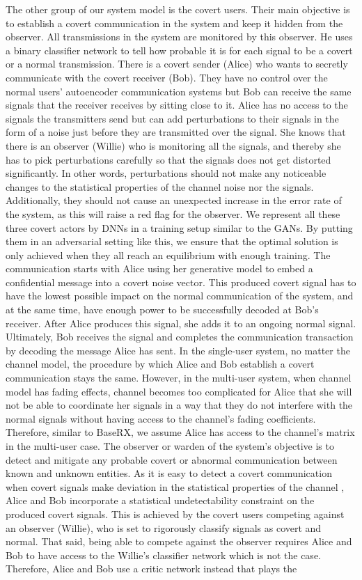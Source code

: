 The other group of our system model is the covert users. Their main objective is to establish a covert communication in the system and keep it hidden from the observer. All transmissions in the system are monitored by this observer. He uses a binary classifier network to tell how probable it is for each signal to be a covert or a normal transmission. There is a covert sender (Alice) who wants to secretly communicate with the covert receiver (Bob). They have no control over the normal users' autoencoder communication systems but Bob can receive the same signals that the receiver receives by sitting close to it. Alice has no access to the signals the transmitters send but can add perturbations to their signals in the form of a noise just before they are transmitted over the signal. She knows that there is an observer (Willie) who is monitoring all the signals, and thereby she has to pick perturbations carefully so that the signals does not get distorted significantly. In other words, perturbations should not make any noticeable changes to the statistical properties of the channel noise nor the signals. Additionally, they should not cause an unexpected increase in the error rate of the system, as this will raise a red flag for the observer. We represent all these three covert actors by DNNs in a training setup similar to the GANs. By putting them in an adversarial setting like this, we ensure that the optimal solution is only achieved when they all reach an equilibrium with enough training. The communication starts with Alice using her generative model to embed a confidential message into a covert noise vector. This produced covert signal has to have the lowest possible impact on the normal communication of the system, and at the same time, have enough power to be successfully decoded at Bob's receiver. After Alice produces this signal, she adds it to an ongoing normal signal. Ultimately, Bob receives the signal and completes the communication transaction by decoding the message Alice has sent. In the single-user system, no matter the channel model, the procedure by which Alice and Bob establish a covert communication stays the same. However, in the multi-user system, when channel model has fading effects, channel becomes too complicated for Alice that she will not be able to coordinate her signals in a way that they do not interfere with the normal signals without having access to the channel's fading coefficients. Therefore, similar to BaseRX, we assume Alice has access to the channel's matrix in the multi-user case. The observer or warden of the system's objective is to detect and mitigate any probable covert or abnormal communication between known and unknown entities. As it is easy to detect a covert communication when covert signals make deviation in the statistical properties of the channel \cite{huang2020exploiting}, Alice and Bob incorporate a statistical undetectability constraint on the produced covert signals. This is achieved by the covert users competing against an observer (Willie), who is set to rigorously classify signals as covert and normal. That said, being able to compete against the observer requires Alice and Bob to have access to the Willie's classifier network which is not the case. Therefore, Alice and Bob use a critic network instead that plays the 